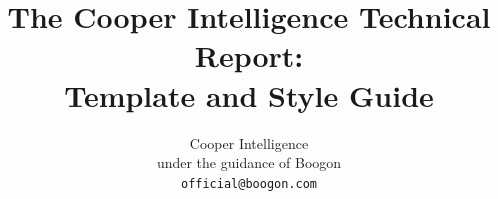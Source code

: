 \documentclass[11pt, a4paper, logo, copyright]{boogonreport}
\title{\centering The Cooper Intelligence Technical Report:\\ Template and Style Guide}
\author[*]{
Cooper Intelligence\\
\small under the guidance of Boogon\\
\small \texttt{official@boogon.com}
}
\begin{document}
\maketitle

\reporttoc











\appendix

\end{document}
